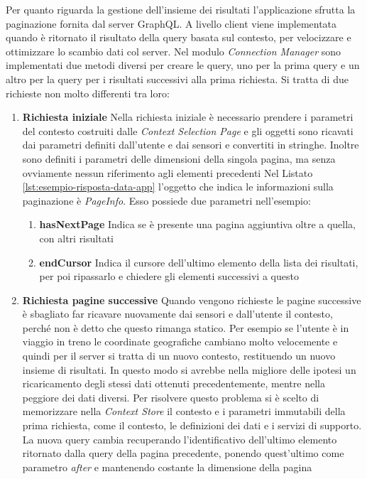 Per quanto riguarda la gestione dell'insieme dei risultati l'applicazione sfrutta la paginazione fornita dal server GraphQL. A livello client viene implementata quando è ritornato il risultato della query basata sul contesto, per velocizzare e ottimizzare lo scambio dati col server. Nel modulo \emph{Connection Manager} sono implementati due metodi diversi per creare le query, uno per la prima query e un altro per la query per i risultati successivi alla prima richiesta. Si tratta di due richieste non molto differenti tra loro:
\begin{enumerate}
	\item \textbf{Richiesta iniziale} Nella richiesta iniziale è necessario prendere i parametri del contesto costruiti dalle \emph{Context Selection Page} e gli oggetti sono ricavati dai parametri definiti dall'utente e dai sensori e convertiti in stringhe. Inoltre sono definiti i parametri delle dimensioni della singola pagina, ma senza ovviamente nessun riferimento agli elementi precedenti
	Nel Listato \ref{lst:esempio-risposta-data-app} l'oggetto che indica le informazioni sulla paginazione è \emph{PageInfo}. Esso possiede due parametri nell'esempio:
	\begin{enumerate}
		\item \textbf{hasNextPage} Indica se è presente una pagina aggiuntiva oltre a quella, con altri risultati
		\item \textbf{endCursor} Indica il cursore dell'ultimo elemento della lista dei risultati, per poi ripassarlo e chiedere gli elementi successivi a questo
	\end{enumerate}
	\item \textbf{Richiesta pagine successive} Quando vengono richieste le pagine successive è sbagliato far ricavare nuovamente dai sensori e dall'utente il contesto, perché non è detto che questo rimanga statico. Per esempio se l'utente è in viaggio in treno le coordinate geografiche cambiano molto velocemente e quindi per il server si tratta di un nuovo contesto, restituendo un nuovo insieme di risultati. In questo modo si avrebbe nella migliore delle ipotesi un ricaricamento degli stessi dati ottenuti precedentemente, mentre nella peggiore dei dati diversi. Per risolvere questo problema si è scelto di memorizzare nella \emph{Context Store} il contesto e i parametri immutabili della prima richiesta, come il contesto, le definizioni dei dati e i servizi di supporto. La nuova query cambia recuperando l'identificativo dell'ultimo elemento ritornato dalla query della pagina precedente, ponendo quest'ultimo come parametro \emph{after} e mantenendo costante la dimensione della pagina
\end{enumerate} 

